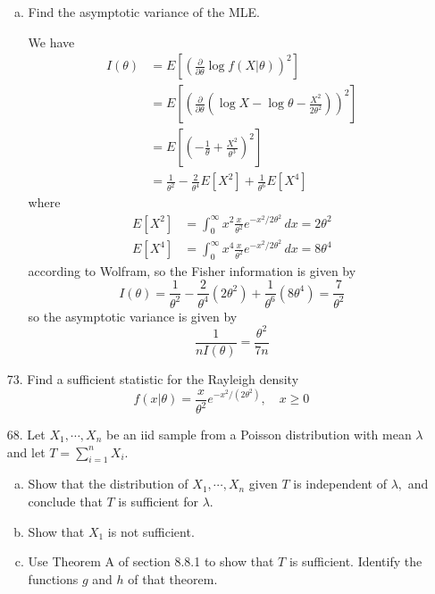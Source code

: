 \documentclass{article}
\begin{document}
\begin{itemize}
\begin{enumerate}[a.]
			\item Find the asymptotic variance of the MLE.
				\begin{soln}
					We have
					\begin{align*}
						I(\theta) &= E\left[ \left(\frac{\partial}{\partial\theta}\log f(X|\theta)\right)^2 \right] \\
						&= E\left[\left( \frac{\partial}{\partial\theta}\left( \log X-\log \theta-\frac{X^2}{2\theta^2} \right)\right)^2 \right] \\
						&= E\left[ \left(-\frac{1}{\theta}+\frac{X^2}{\theta^3}\right)^2 \right] \\
						&= \frac{1}{\theta^2}-\frac{2}{\theta^4}E[X^2]+\frac{1}{\theta^6}E[X^4]
					\end{align*} where 
					\begin{align*}
						E[X^2] &= \int_0^\infty x^2\frac{x}{\theta^2}e^{-x^2/2\theta^2}\, dx=2\theta^2 \\
						E[X^4] &= \int_0^\infty x^4 \frac{x}{\theta^2}e^{-x^2/2\theta^2}\, dx = 8\theta^4
					\end{align*} according to Wolfram, so the Fisher information is given by \[I(\theta)=\frac{1}{\theta^2}-\frac{2}{\theta^4}(2\theta^2)+\frac{1}{\theta^6}(8\theta^4)=\frac{7}{\theta^2}\] so the asymptotic variance is given by \[\frac{1}{nI(\theta)}=\frac{\theta^2}{7n}\]
					
				\end{soln}
				
		\end{enumerate}

	\item[73.] Find a sufficient statistic for the Rayleigh density \[f(x|\theta)=\frac{x}{\theta^2}e^{-x^2/(2\theta^2)}, \quad x\ge 0\]
		
	\item[68.] Let $X_1, \cdots, X_n$ be an iid sample from a Poisson distribution with mean $\lambda$ and let $T=\displaystyle \sum_{i=1}^{n} X_i.$

		\begin{enumerate}[a.]
			\item Show that the distribution of $X_1, \cdots, X_n$ given $T$ is independent of $\lambda,$ and conclude that $T$ is sufficient for $\lambda.$

			\item Show that $X_1$ is not sufficient.

			\item Use Theorem A of section 8.8.1 to show that $T$ is sufficient. Identify the functions $g$ and $h$ of that theorem.
				

\end{enumerate}
\end{itemize}
\end{document}
